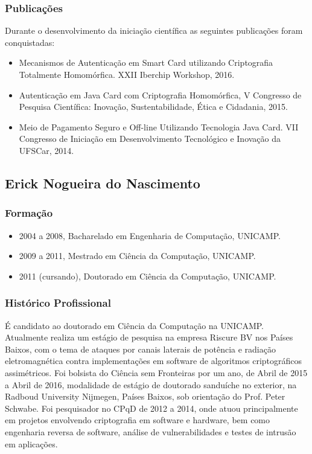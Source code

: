 \documentclass[12pt]{article}
\begin{document}
\subsubsection{Publica\c{c}\~oes}
Durante o desenvolvimento da inicia\c{c}\~ao cient\'ifica as seguintes publica\c{c}\~oes foram conquistadas:\\
\begin{itemize}
\item Mecanismos de Autenticação em Smart Card utilizando Criptografia Totalmente Homomórfica. XXII Iberchip Workshop, 2016.
\item Autenticação em Java Card com Criptografia Homomórfica, V Congresso de Pesquisa Científica: Inovação, Sustentabilidade, Ética e Cidadania, 2015.
\item Meio de Pagamento Seguro e Off-line Utilizando Tecnologia Java Card. VII Congresso de Iniciação em Desenvolvimento Tecnológico e Inovação da UFSCar, 2014.
\end{itemize}

\subsection{Erick Nogueira do Nascimento}

\subsubsection*{Formação}
\begin{itemize}\setlength\itemsep{1pt}
\item 2004 a 2008, Bacharelado em Engenharia de Computação, UNICAMP.
\item 2009 a 2011, Mestrado em Ciência da Computação, UNICAMP.
\item 2011 (cursando), Doutorado em Ciência da Computação, UNICAMP.
\end{itemize}

\subsubsection*{Histórico Profissional}

É candidato ao doutorado em Ciência da Computação na UNICAMP. Atualmente realiza um estágio de pesquisa na empresa Riscure BV nos Países Baixos, com o tema de ataques por canais laterais de potência e radiação eletromagnética contra implementações em software de algoritmos criptográficos assimétricos. Foi bolsista do Ciência sem Fronteiras por um ano, de Abril de 2015 a Abril de 2016, modalidade de estágio de doutorado sanduíche no exterior, na Radboud University Nijmegen, Países Baixos, sob orientação do Prof. Peter Schwabe. Foi pesquisador no CPqD de 2012 a 2014, onde atuou principalmente em projetos envolvendo criptografia em software e hardware, bem como engenharia reversa de software, análise de vulnerabilidades e testes de intrusão em aplicações. 
\end{document}
